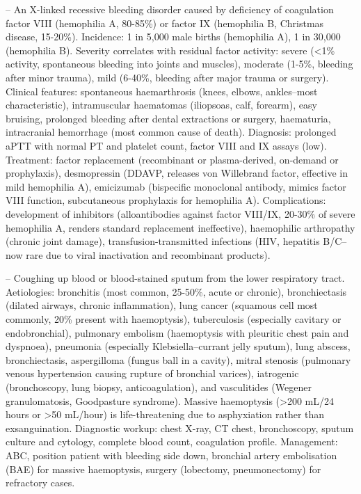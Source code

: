 -- An X-linked recessive bleeding disorder caused by deficiency of coagulation factor VIII (hemophilia A, 80-85\%) or factor IX (hemophilia B, Christmas disease, 15-20\%). Incidence: 1 in 5,000 male births (hemophilia A), 1 in 30,000 (hemophilia B). Severity correlates with residual factor activity: severe (<1\% activity, spontaneous bleeding into joints and muscles), moderate (1-5\%, bleeding after minor trauma), mild (6-40\%, bleeding after major trauma or surgery). Clinical features: spontaneous haemarthrosis (knees, elbows, ankles--most characteristic), intramuscular haematomas (iliopsoas, calf, forearm), easy bruising, prolonged bleeding after dental extractions or surgery, haematuria, intracranial hemorrhage (most common cause of death). Diagnosis: prolonged aPTT with normal PT and platelet count, factor VIII and IX assays (low). Treatment: factor replacement (recombinant or plasma-derived, on-demand or prophylaxis), desmopressin (DDAVP, releases von Willebrand factor, effective in mild hemophilia A), emicizumab (bispecific monoclonal antibody, mimics factor VIII function, subcutaneous prophylaxis for hemophilia A). Complications: development of inhibitors (alloantibodies against factor VIII/IX, 20-30\% of severe hemophilia A, renders standard replacement ineffective), haemophilic arthropathy (chronic joint damage), transfusion-transmitted infections (HIV, hepatitis B/C--now rare due to viral inactivation and recombinant products).

-- Coughing up blood or blood-stained sputum from the lower respiratory tract. Aetiologies: bronchitis (most common, 25-50\%, acute or chronic), bronchiectasis (dilated airways, chronic inflammation), lung cancer (squamous cell most commonly, 20\% present with haemoptysis), tuberculosis (especially cavitary or endobronchial), pulmonary embolism (haemoptysis with pleuritic chest pain and dyspnoea), pneumonia (especially Klebsiella--currant jelly sputum), lung abscess, bronchiectasis, aspergilloma (fungus ball in a cavity), mitral stenosis (pulmonary venous hypertension causing rupture of bronchial varices), iatrogenic (bronchoscopy, lung biopsy, anticoagulation), and vasculitides (Wegener granulomatosis, Goodpasture syndrome). Massive haemoptysis (>200 mL/24 hours or >50 mL/hour) is life-threatening due to asphyxiation rather than exsanguination. Diagnostic workup: chest X-ray, CT chest, bronchoscopy, sputum culture and cytology, complete blood count, coagulation profile. Management: ABC, position patient with bleeding side down, bronchial artery embolisation (BAE) for massive haemoptysis, surgery (lobectomy, pneumonectomy) for refractory cases.


